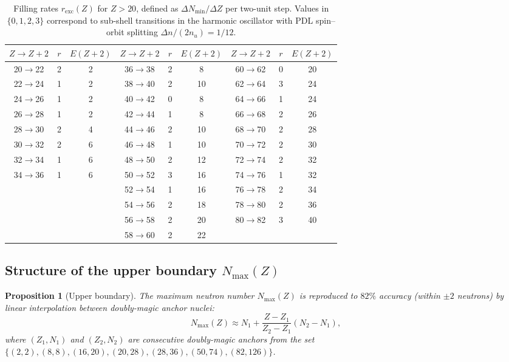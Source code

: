 \documentclass{article}
\newtheorem{proposition}[theorem]{Proposition}
\theoremstyle{remark}
\newcommand{\Nmin}{N_{\min}}
\newcommand{\Nmax}{N_{\max}}
\newcommand{\Deltanop}{\Delta n}
\begin{document}
\begin{table}[ht]
\centering
\caption{Filling rates $r_{\mathrm{exc}}(Z)$ for $Z > 20$, defined as $\Delta\Nmin / \Delta Z$ per two-unit step. Values in $\{0,1,2,3\}$ correspond to sub-shell transitions in the harmonic oscillator with PDL spin--orbit splitting $\Deltanop/(2n_u) = 1/12$.}
\label{tab:filling}
\small
\begin{tabular}{ccc|ccc|ccc}
\toprule
$Z\to Z{+}2$ & $r$ & $E(Z{+}2)$ & $Z\to Z{+}2$ & $r$ & $E(Z{+}2)$ & $Z\to Z{+}2$ & $r$ & $E(Z{+}2)$ \\
\midrule
20$\to$22 & 2 & 2  & 36$\to$38 & 2 & 8  & 60$\to$62 & 0 & 20 \\
22$\to$24 & 1 & 2  & 38$\to$40 & 2 & 10 & 62$\to$64 & 3 & 24 \\
24$\to$26 & 1 & 2  & 40$\to$42 & 0 & 8  & 64$\to$66 & 1 & 24 \\
26$\to$28 & 1 & 2  & 42$\to$44 & 1 & 8  & 66$\to$68 & 2 & 26 \\
28$\to$30 & 2 & 4  & 44$\to$46 & 2 & 10 & 68$\to$70 & 2 & 28 \\
30$\to$32 & 2 & 6  & 46$\to$48 & 1 & 10 & 70$\to$72 & 2 & 30 \\
32$\to$34 & 1 & 6  & 48$\to$50 & 2 & 12 & 72$\to$74 & 2 & 32 \\
34$\to$36 & 1 & 6  & 50$\to$52 & 3 & 16 & 74$\to$76 & 1 & 32 \\
          &   &    & 52$\to$54 & 1 & 16 & 76$\to$78 & 2 & 34 \\
          &   &    & 54$\to$56 & 2 & 18 & 78$\to$80 & 2 & 36 \\
          &   &    & 56$\to$58 & 2 & 20 & 80$\to$82 & 3 & 40 \\
          &   &    & 58$\to$60 & 2 & 22 &           &   &    \\
\bottomrule
\end{tabular}
\end{table}

\subsection{Structure of the upper boundary \texorpdfstring{$\Nmax(Z)$}{Nmax(Z)}}

\begin{proposition}[Upper boundary]
\label{prop:nmax}
The maximum neutron number $\Nmax(Z)$ is reproduced to $82\%$ accuracy (within $\pm 2$ neutrons) by linear interpolation between doubly-magic anchor nuclei:
\begin{equation}
  \Nmax(Z) \approx N_1 + \frac{Z - Z_1}{Z_2 - Z_1}(N_2 - N_1),
  \label{eq:nmax}
\end{equation}
where $(Z_1, N_1)$ and $(Z_2, N_2)$ are consecutive doubly-magic anchors from the set $\{(2,2),(8,8),(16,20),(20,28),(28,36),(50,74),(82,126)\}$.
\end{proposition}
\end{document}
